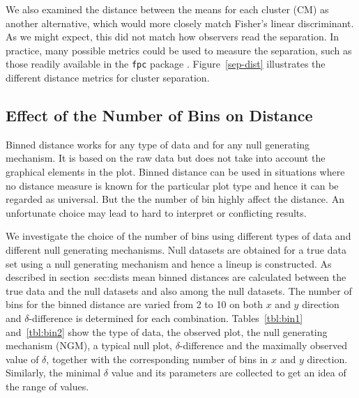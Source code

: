\documentclass[12pt]{article}\usepackage[]{graphicx}\usepackage[]{color}
\newcommand{\hh}[1]{{\color{magenta} #1}}
\begin{document}
\begin{enumerate}
We also examined the distance between the means for each cluster (CM) as another alternative, which would more closely match Fisher's linear discriminant. As we might expect, this did not match how observers read the separation. In practice, many possible metrics could be used to measure the separation, such as those readily available in the {\tt fpc} package  \citep{hennig:2010}.
Figure~\ref{sep-dist} illustrates the different distance metrics for cluster separation. 
\end{enumerate}


% 


\subsection*{Effect of the Number of Bins on Distance} \label{sec:nbin}

Binned distance works for any type of data and for any null generating mechanism. It is based on the raw data but does not take into account the graphical elements in the plot. Binned distance can be used in situations where no distance measure is known for the particular plot type and hence it can be regarded as universal. But the  the number of bin  highly affect the distance. An unfortunate choice may lead to hard to interpret or conflicting results. %

We investigate the choice of the number of bins using different types of data
and  different null generating mechanisms. Null datasets are obtained for a true data set using a null generating mechanism and hence a lineup is constructed. As described in section~{sec:dists} mean binned distances are calculated between the true data and the null datasets and also among the null datasets. The number of bins for the binned distance are varied from 2 to 10 on both $x$ and $y$ direction and $\delta$-difference is determined for each combination. Tables~\ref{tbl:bin1} and~\ref{tbl:bin2} show the type of data, the observed plot, the null generating mechanism (NGM), a typical null plot, $\delta$-difference and the maximally observed value of $\delta$, together with the corresponding number of bins in $x$ and $y$ direction. Similarly, the minimal $\delta$ value and its parameters are collected to get an idea of the range of values.
\end{document}
